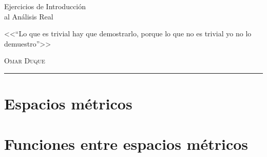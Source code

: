 \documentclass[12pt,a4paper]{report}
\begin{document}
\begin{titlepage}
\vspace*{2cm}

\noindent
\vspace*{0.5cm}
\titlefont Ejercicios de Introducción\\ al Análisis Real \par
\vspace{1.5cm}
\epigraph{<<``Lo que es trivial hay que demostrarlo, porque lo que no es trivial yo no lo demuestro''>>}%
{ \textsc{Omar Duque}}
\null\vfill
\vspace*{1cm}
\noindent
\hfill
\begin{minipage}{0.45\linewidth}
    \begin{flushright}
        \printauthor
    \end{flushright}
\end{minipage}
%
\begin{minipage}{0.02\linewidth}
    \rule{1pt}{120pt}
\end{minipage}
\titlepagedecoration
\end{titlepage}


\tableofcontents
\cleardoublepage


\chapter{Espacios métricos}

\chapter{Funciones entre espacios métricos}

\end{document}
